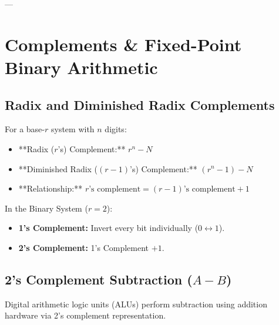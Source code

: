 ---

\section{Complements \& Fixed-Point Binary Arithmetic}

\subsection{Radix and Diminished Radix Complements}
For a base-$r$ system with $n$ digits:
\begin{itemize}
    \item **Radix ($r$'s) Complement:** $r^n - N$
    \item **Diminished Radix ($(r-1)$'s) Complement:** $(r^n - 1) - N$
    \item **Relationship:** $r\text{'s complement} = (r-1)\text{'s complement} + 1$
\end{itemize}

\noindent In the Binary System ($r=2$):
\begin{itemize}
    \item \textbf{1's Complement:} Invert every bit individually ($0 \leftrightarrow 1$).
    \item \textbf{2's Complement:} 1's Complement $+ 1$.
\end{itemize}

\subsection{2's Complement Subtraction \texorpdfstring{($A - B$)}{(A - B)}}
Digital arithmetic logic units (ALUs) perform subtraction using addition hardware via 2's complement representation.

